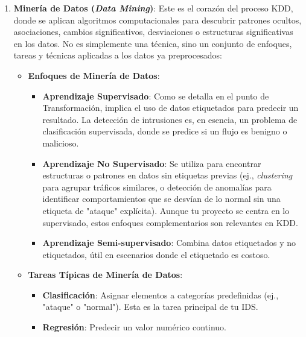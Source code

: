 \begin{enumerate}
    \item\textbf{Minería de Datos (\textit{Data Mining})}: Este es el corazón del proceso KDD, donde se aplican algoritmos computacionales para descubrir patrones ocultos, asociaciones, cambios significativos, desviaciones o estructuras significativas en los datos. No es simplemente una técnica, sino un conjunto de enfoques, tareas y técnicas aplicadas a los datos ya preprocesados:
    \begin{itemize}

    \item\textbf{Enfoques de Minería de Datos}:
        \begin{itemize}
        
            \item\textbf{Aprendizaje Supervisado}: Como se detalla en el punto de Transformación, implica el uso de datos etiquetados para predecir un resultado. La detección de intrusiones es, en esencia, un problema de clasificación supervisada, donde se predice si un flujo es benigno o malicioso.
            
            \item\textbf{Aprendizaje No Supervisado}: Se utiliza para encontrar estructuras o patrones en datos sin etiquetas previas (ej., \textit{clustering} para agrupar tráficos similares, o detección de anomalías para identificar comportamientos que se desvían de lo normal sin una etiqueta de "ataque" explícita). Aunque tu proyecto se centra en lo supervisado, estos enfoques complementarios son relevantes en KDD.
            
            \item\textbf{Aprendizaje Semi-supervisado}: Combina datos etiquetados y no etiquetados, útil en escenarios donde el etiquetado es costoso.
            
        \end{itemize}

    \item\textbf{Tareas Típicas de Minería de Datos}:
        \begin{itemize}
        
            \item\textbf{Clasificación}: Asignar elementos a categorías predefinidas (ej., "ataque" o "normal"). Esta es la tarea principal de tu IDS.
            
            \item\textbf{Regresión}: Predecir un valor numérico continuo.
            

\end{itemize}
\end{itemize}
\end{enumerate}
